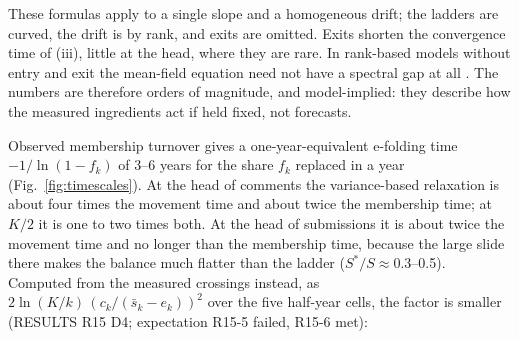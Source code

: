 \documentclass[10pt]{article}
\begin{document}
These formulas apply to a single slope and a homogeneous drift; the ladders are curved, the drift is by rank, and exits are omitted. Exits shorten the convergence time of (iii), little at the head, where they are rare. In rank-based models without entry and exit the mean-field equation need not have a spectral gap at all \cite{bakersmyth2026}. The numbers are therefore orders of magnitude, and model-implied: they describe how the measured ingredients act if held fixed, not forecasts.
\begin{center}\small{}\end{center}
Observed membership turnover gives a one-year-equivalent e-folding time $-1/\ln(1-f_k)$ of 3--6 years for the share $f_k$ replaced in a year (Fig.~\ref{fig:timescales}). At the head of comments the variance-based relaxation is about four times the movement time and about twice the membership time; at $K/2$ it is one to two times both. At the head of submissions it is about twice the movement time and no longer than the membership time, because the large slide there makes the balance much flatter than the ladder ($S^\ast/S \approx 0.3$--0.5). Computed from the measured crossings instead, as $2\ln(K/k)\,(c_k/(\bar s_k - e_k))^2$ over the five half-year cells, the factor is smaller (RESULTS R15 D4; expectation R15-5 failed, R15-6 met):
\end{document}
